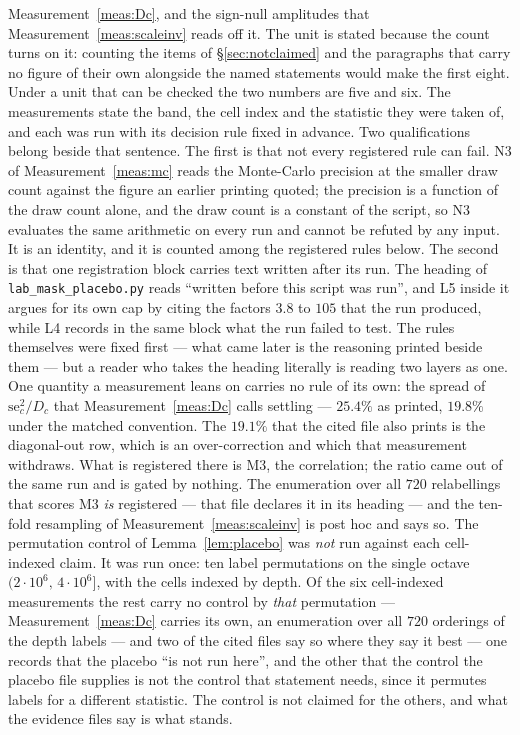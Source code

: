 \documentclass[11pt,a4paper]{article}
\theoremstyle{plain}
\theoremstyle{definition}
\theoremstyle{remark}
\begin{document}
Measurement~\ref{meas:Dc}, and the sign-null amplitudes that
Measurement~\ref{meas:scaleinv} reads off it. The unit is stated because
the count turns on it: counting the items of \S\ref{sec:notclaimed} and
the paragraphs that carry no figure of their own alongside the named
statements would make the first eight. Under a unit that can be checked
the two numbers are five and six.
The measurements state the band, the cell index and the statistic they
were taken of, and each was run with its decision rule fixed in
advance. Two qualifications belong beside that sentence.
The first is that not every registered rule can fail. N3 of
Measurement~\ref{meas:mc} reads the Monte-Carlo precision at the
smaller draw count against the figure an earlier printing quoted; the
precision is a function of the draw count alone, and the draw count is
a constant of the script, so N3 evaluates the same arithmetic on every
run and cannot be refuted by any input. It is an identity, and it is
counted among the registered rules below.
The second is that one registration block carries text written after
its run. The heading of \texttt{lab\_mask\_placebo.py} reads ``written
before this script was run'', and L5 inside it argues for its own cap
by citing the factors $3.8$ to $105$ that the run produced, while L4
records in the same block what the run failed to test. The rules
themselves were fixed first --- what came later is the reasoning
printed beside them --- but a reader who takes the heading literally
is reading two layers as one.
One quantity a measurement leans on carries no rule of its
own: the spread of $\mathrm{se}_c^2/D_c$ that
Measurement~\ref{meas:Dc} calls settling --- $25.4\%$ as printed,
$19.8\%$ under the matched convention. The $19.1\%$ that the cited
file also prints is the diagonal-out row, which is an over-correction
and which that measurement withdraws. What is registered there is
M3, the correlation; the ratio came out of the same run and is gated
by nothing. The enumeration over all $720$ relabellings that scores M3
\emph{is} registered --- that file declares it in its heading --- and
the ten-fold resampling of Measurement~\ref{meas:scaleinv} is post hoc
and says so. The permutation control of Lemma~\ref{lem:placebo} was
\emph{not} run against each cell-indexed claim. It was run once: ten
label permutations on the single octave $(2\cdot10^6,\,4\cdot10^6]$,
with the cells indexed by depth. Of the six cell-indexed measurements
the rest carry no control by \emph{that} permutation ---
Measurement~\ref{meas:Dc} carries its own, an enumeration over all
$720$ orderings of the depth labels --- and two of the cited files say
so where they say it best --- one records that the placebo ``is not
run here'', and the other that the control the placebo file supplies
is not the control that statement needs, since it permutes labels for
a different statistic. The control is not claimed for the others, and
what the evidence files say is what stands.
\end{document}

